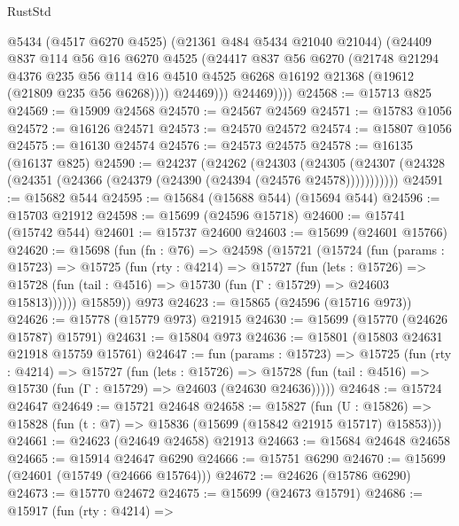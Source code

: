 \begin{lexlean}{RustStd}
\begin{coremodule}
                @5434
                (@4517 @6270 @4525)
                (@21361 @484 @5434 @21040 @21044)
                (@24409
                  @837
                  @114
                  @56
                  @16
                  @6270
                  @4525
                  (@24417
                    @837
                    @56
                    @6270
                    (@21748
                      @21294
                      @4376
                      @235
                      @56
                      @114
                      @16
                      @4510
                      @4525
                      @6268
                      @16192
                      @21368
                      (@19612 (@21809 @235 @56 @6268))))
                  @24469)))
            @24469))))
@24568 := @15713 @825
@24569 := @15909 @24568
@24570 := @24567 @24569
@24571 := @15783 @1056
@24572 := @16126 @24571
@24573 := @24570 @24572
@24574 := @15807 @1056
@24575 := @16130 @24574
@24576 := @24573 @24575
@24578 := @16135 (@16137 @825)
@24590 := @24237
    (@24262
      (@24303
        (@24305 (@24307 (@24328 (@24351 (@24366 (@24379 (@24390 (@24394 (@24576 @24578)))))))))))
@24591 := @15682 @544
@24595 := @15684 (@15688 @544) (@15694 @544)
@24596 := @15703 @21912
@24598 := @15699 (@24596 @15718)
@24600 := @15741 (@15742 @544)
@24601 := @15737 @24600
@24603 := @15699 (@24601 @15766)
@24620 := @15698
    (fun (fn : @76) =>
    @24598
      (@15721
        (@15724
          (fun (params : @15723) =>
          @15725
            (fun (rty : @4214) =>
            @15727
              (fun (lets : @15726) =>
              @15728 (fun (tail : @4516) => @15730 (fun (Γ : @15729) => @24603 @15813))))))
        @15859))
    @973
@24623 := @15865 (@24596 (@15716 @973))
@24626 := @15778 (@15779 @973) @21915
@24630 := @15699 (@15770 (@24626 @15787) @15791)
@24631 := @15804 @973
@24636 := @15801 (@15803 @24631 @21918 @15759 @15761)
@24647 := fun (params : @15723) =>
  @15725
    (fun (rty : @4214) =>
    @15727
      (fun (lets : @15726) =>
      @15728 (fun (tail : @4516) => @15730 (fun (Γ : @15729) => @24603 (@24630 @24636)))))
@24648 := @15724 @24647
@24649 := @15721 @24648
@24658 := @15827
    (fun (U : @15826) => @15828 (fun (t : @7) => @15836 (@15699 (@15842 @21915 @15717) @15853)))
@24661 := @24623 (@24649 @24658) @21913
@24663 := @15684 @24648 @24658
@24665 := @15914 @24647 @6290
@24666 := @15751 @6290
@24670 := @15699 (@24601 (@15749 (@24666 @15764)))
@24672 := @24626 (@15786 @6290)
@24673 := @15770 @24672
@24675 := @15699 (@24673 @15791)
@24686 := @15917
    (fun (rty : @4214) =>

\end{coremodule}
\end{lexlean}
